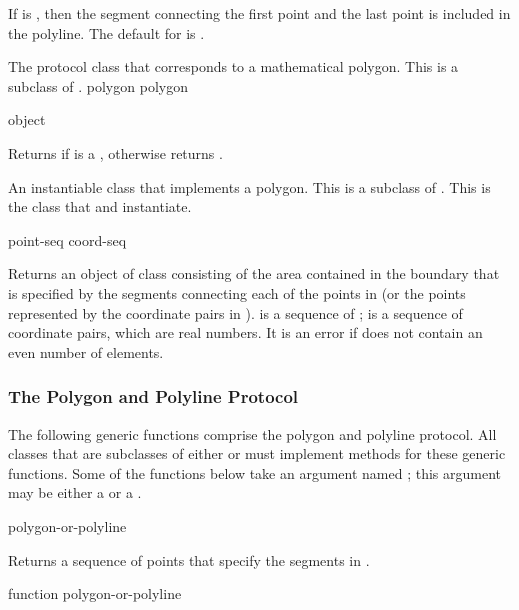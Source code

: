 If  is , then the segment connecting the first point and
the last point is included in the polyline.  The default for  is
.

\MayCaptureInputs



The protocol class that corresponds to a mathematical polygon.  This is a
subclass of .
 {polygon} {polygon}

 {object}

Returns  if  is a , otherwise returns
.


An instantiable class that implements a polygon.  This is a subclass of
.  This is the class that  and 
instantiate.
\Immutable

  {point-seq}
 {coord-seq}

Returns an object of class  consisting of the area
contained in the boundary that is specified by the segments connecting each of
the points in  (or the points represented by the coordinate pairs
in ).   is a sequence of ;
 is a sequence of coordinate pairs, which are real numbers.  It
is an error if  does not contain an even number of elements.

\MayCaptureInputs


\subsubsection {The Polygon and Polyline Protocol}

The following generic functions comprise the polygon and polyline protocol.  All
classes that are subclasses of either  or  must
implement methods for these generic functions.  Some of the functions below take
an argument named ; this argument may be either a
 or a .

 {polygon-or-polyline}

Returns a sequence of points that specify the segments in .
\ReadOnly

 {function polygon-or-polyline}

